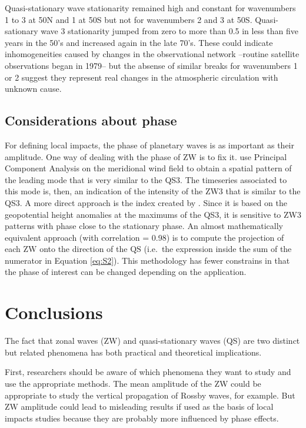 \documentclass[draft,linenumbers]{agujournal2018}
\begin{document}
Quasi-stationary wave stationarity remained high and constant for
wavenumbers 1 to 3 at 50\degree N and 1 at 50\degree S but not for
wavenumbers 2 and 3 at 50\degree S. Quasi-sationary wave 3 stationarity
jumped from zero to more than 0.5 in less than five years in the 50's
and increased again in the late 70's. These could indicate
inhomogeneities caused by changes in the observational network --routine
satellite observations began in 1979-- but the absense of similar breaks
for wavenumbers 1 or 2 suggest they represent real changes in the
atmospheric circulation with unknown cause.

\subsection{Considerations about phase}

\label{sec:phase}

For defining local impacts, the phase of planetary waves is as important
as their amplitude. One way of dealing with the phase of ZW is to fix
it. \citet{Yuan2008} use Principal Component Analysis on the meridional
wind field to obtain a spatial pattern of the leading mode that is very
similar to the QS3. The timeseries associated to this mode is, then, an
indication of the intensity of the ZW3 that is similar to the QS3. A
more direct approach is the index created by \citet{Raphael2004}. Since
it is based on the geopotential height anomalies at the maximums of the
QS3, it is sensitive to ZW3 patterns with phase close to the stationary
phase. An almost mathematically equivalent approach (with correlation =
0.98) is to compute the projection of each \(\mathrm{ZW}\) onto the
direction of the \(\mathrm{QS}\) (i.e.~the expression inside the sum of
the numerator in Equation \ref{eq:S2}). This methodology has fewer
constrains in that the phase of interest can be changed depending on the
application.

\section{Conclusions}

The fact that zonal waves (ZW) and quasi-stationary waves (QS) are two
distinct but related phenomena has both practical and theoretical
implications.

First, researchers should be aware of which phenomena they want to study
and use the appropriate methods. The mean amplitude of the ZW could be
appropriate to study the vertical propagation of Rossby waves, for
example. But ZW amplitude could lead to misleading results if used as
the basis of local impacts studies because they are probably more
influenced by phase effects.
\end{document}

